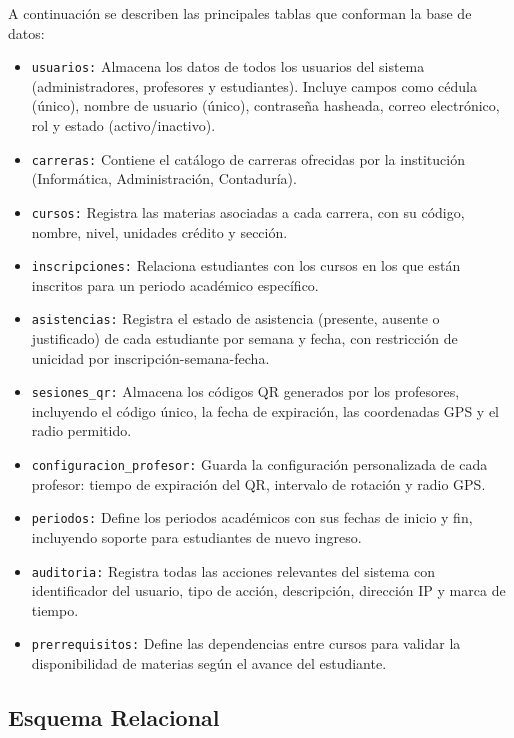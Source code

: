 \documentclass[12pt, letterpaper, oneside]{report}
\begin{document}
A continuaci\'on se describen las principales tablas que conforman la base de datos:

\begin{itemize}
  \item \texttt{usuarios:} Almacena los datos de todos los usuarios del sistema (administradores, profesores y estudiantes). Incluye campos como c\'edula (\'unico), nombre de usuario (\'unico), contrase\~na hasheada, correo electr\'onico, rol y estado (activo/inactivo).
  \item \texttt{carreras:} Contiene el cat\'alogo de carreras ofrecidas por la instituci\'on (Inform\'atica, Administraci\'on, Contadur\'ia).
  \item \texttt{cursos:} Registra las materias asociadas a cada carrera, con su c\'odigo, nombre, nivel, unidades cr\'edito y secci\'on.
  \item \texttt{inscripciones:} Relaciona estudiantes con los cursos en los que est\'an inscritos para un periodo acad\'emico espec\'ifico.
  \item \texttt{asistencias:} Registra el estado de asistencia (presente, ausente o justificado) de cada estudiante por semana y fecha, con restricci\'on de unicidad por inscripci\'on-semana-fecha.
  \item \texttt{sesiones\_qr:} Almacena los c\'odigos QR generados por los profesores, incluyendo el c\'odigo \'unico, la fecha de expiraci\'on, las coordenadas GPS y el radio permitido.
  \item \texttt{configuracion\_profesor:} Guarda la configuraci\'on personalizada de cada profesor: tiempo de expiraci\'on del QR, intervalo de rotaci\'on y radio GPS.
  \item \texttt{periodos:} Define los periodos acad\'emicos con sus fechas de inicio y fin, incluyendo soporte para estudiantes de nuevo ingreso.
  \item \texttt{auditoria:} Registra todas las acciones relevantes del sistema con identificador del usuario, tipo de acci\'on, descripci\'on, direcci\'on IP y marca de tiempo.
  \item \texttt{prerrequisitos:} Define las dependencias entre cursos para validar la disponibilidad de materias seg\'un el avance del estudiante.
\end{itemize}

\subsection{Esquema Relacional}
\end{document}
